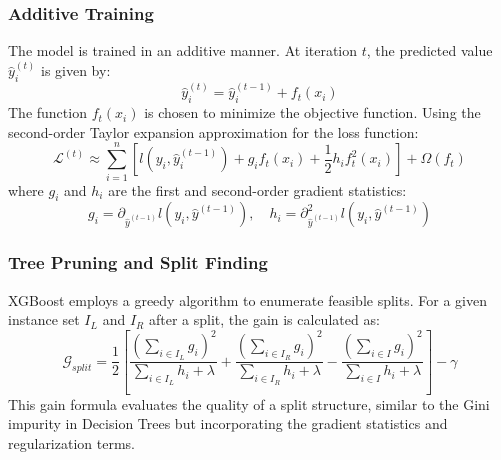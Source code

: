 \documentclass[12pt,a4paper]{report}
\begin{document}
\subsubsection{Additive Training}
The model is trained in an additive manner. At iteration $t$, the predicted value $\hat{y}_i^{(t)}$ is given by:
\begin{equation}
\hat{y}_i^{(t)} = \hat{y}_i^{(t-1)} + f_t(x_i)
\label{eq:xgb_additive}
\end{equation}
The function $f_t(x_i)$ is chosen to minimize the objective function. Using the second-order Taylor expansion approximation for the loss function:
\begin{equation}
\mathcal{L}^{(t)} \approx \sum_{i=1}^{n} [l(y_i, \hat{y}_i^{(t-1)}) + g_i f_t(x_i) + \frac{1}{2} h_i f_t^2(x_i)] + \Omega(f_t)
\label{eq:xgb_taylor}
\end{equation}
where $g_i$ and $h_i$ are the first and second-order gradient statistics:
\begin{equation}
g_i = \partial_{\hat{y}^{(t-1)}} l(y_i, \hat{y}^{(t-1)}), \quad h_i = \partial^2_{\hat{y}^{(t-1)}} l(y_i, \hat{y}^{(t-1)})
\label{eq:xgb_gradients}
\end{equation}

\subsubsection{Tree Pruning and Split Finding}
XGBoost employs a greedy algorithm to enumerate feasible splits. For a given instance set $I_L$ and $I_R$ after a split, the gain is calculated as:
\begin{equation}
\mathcal{G}_{split} = \frac{1}{2} \left[ \frac{(\sum_{i \in I_L} g_i)^2}{\sum_{i \in I_L} h_i + \lambda} + \frac{(\sum_{i \in I_R} g_i)^2}{\sum_{i \in I_R} h_i + \lambda} - \frac{(\sum_{i \in I} g_i)^2}{\sum_{i \in I} h_i + \lambda} \right] - \gamma
\label{eq:xgb_split_gain}
\end{equation}
This gain formula evaluates the quality of a split structure, similar to the Gini impurity in Decision Trees but incorporating the gradient statistics and regularization terms.
\end{document}
